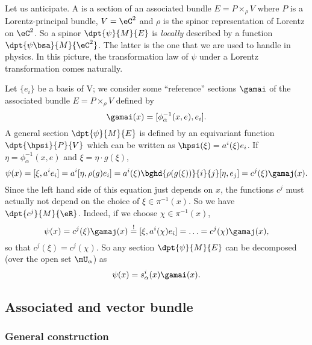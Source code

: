Let us anticipate. A  is a section of an associated bundle $E=P\times_{\rho} V$ where $P$ is a Lorentz-principal bundle, $V=\eC^2$ and $\rho$ is the spinor representation of Lorentz on $\eC^2$. So a spinor $\dpt{\psi}{M}{E}$ is \emph{locally} described by a function $\dpt{\psi\bsa}{M}{\eC^2}$. The latter is the one that we are used to handle in physics. In this picture, the transformation law of $\psi$ under a Lorentz transformation comes naturally.

Let $\{e_i\}$ be a basis of V; we consider some ``reference'' sections $\gamai$ of the associated bundle $E=P\times_{\rho} V$ defined by
\begin{equation}\label{eq:def:gamai}
\gamai(x)=[\phi_{\alpha}^{-1}(x,e),e_i].
\end{equation}
A general section $\dpt{\psi}{M}{E}$ is defined by an equivariant function $\dpt{\hpsi}{P}{V}$ which can be written as $\hpsi(\xi)=a^i(\xi)e_i$. If $\eta=\phi_{\alpha}^{-1}(x,e)$ and $\xi=\eta\cdot g(\xi)$,
\begin{equation}
  \psi(x)=[\xi,a^ie_i]
         =a^i[\eta,\rho(g)e_i]
	 =a^i(\xi)\bghd{\rho(g(\xi))}{i}{j}[\eta,e_j]
	 =c^j(\xi)\gamaj(x).
\end{equation}
Since the left hand side of this equation just depends on $x$, the functions $c^j$ must actually not depend on the choice of $\xi\in\pi^{-1}(x)$. So we have $\dpt{c^j}{M}{\eR}$. Indeed, if we choose $\chi\in\pi^{-1}(x)$, 
\[
  \psi(x)=c^j(\xi)\gamaj(x)
         \stackrel{!}{=}[\xi,a^{i}(\chi)e_i]
	 =\ldots
	 =c^j(\chi)\gamaj(x),
\]
so that $c^j(\xi)=c^j(\chi)$. So any section $\dpt{\psi}{M}{E}$ can be decomposed (over the open set $\mU_{\alpha}$) as 
\begin{equation}
  \psi(x)=s_{\alpha}^i(x)\gamai(x).
\end{equation}


\subsection{Associated and vector bundle}

\subsubsection{General construction}

